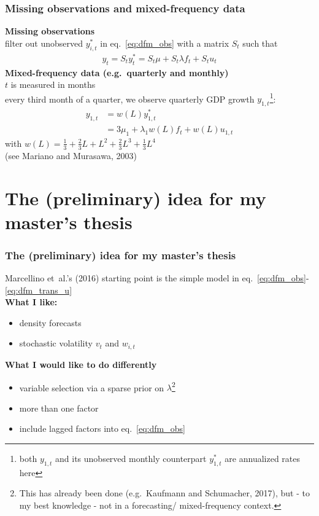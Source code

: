 \documentclass{beamer}
\begin{document}
\begin{frame}
\frametitle{Missing observations and mixed-frequency data}
\textbf{Missing observations}\\
filter out unobserved $y^*_{i,t}$ in eq.~\ref{eq:dfm_obs} with a matrix $S_t$ such that 
\begin{align}
y_t = S_t y^*_t = S_t\mu + S_t \lambda f_t + S_t u_t
\end{align}
\textbf{Mixed-frequency data (e.g.~quarterly and monthly)}\\
$t$ is measured in months \\
every third month of a quarter, we observe quarterly GDP growth $y_{1,t}$\footnote{
both $y_{1,t}$ and its unobserved monthly counterpart $y^*_{1,t}$ are annualized rates here
}:
\begin{align}
y_{1,t} &= w(L) y^*_{1,t} \\
 &= 3\mu_1 + \lambda_1 w(L) f_t + w(L) u_{1,t}
\end{align}
with $w(L) = \frac{1}{3} + \frac{2}{3} L + L^2 + \frac{2}{3} L^3 + \frac{1}{3} L^4$\\
(see Mariano and Murasawa, 2003)
\end{frame}

\section{The (preliminary) idea for my master's thesis}

\begin{frame}
\frametitle{The (preliminary) idea for my master's thesis}
Marcellino et~al.'s (2016) starting point is the simple model in eq.~\ref{eq:dfm_obs}-\ref{eq:dfm_trans_u}
\vspace{0.5cm}\\
\textbf{What I like:}
\begin{itemize}
\item density forecasts
\item stochastic volatility $v_t$ and $w_{i,t}$ 
\end{itemize}
\vspace{0.5cm}
\textbf{What I would like to do differently}
\begin{itemize}
\item variable selection via a sparse prior on $\lambda$\footnote{
This has already been done (e.g.~Kaufmann and Schumacher, 2017), but - to my best knowledge - not in a forecasting/ mixed-frequency context.
}
\item more than one factor
\item include lagged factors into eq.~\ref{eq:dfm_obs}
\end{itemize}
\end{frame}
\end{document}
